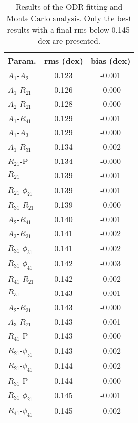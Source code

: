 \documentclass[article]{aa} %
\begin{document}
\begin{table}[]
\caption{\label{Tab:odr_short} \small Results of the ODR fitting and Monte Carlo analysis. Only the best results with a final rms below 0.145$\,$dex are presented.}
\begin{center}
\begin{tabular}{l|c|c}%
\hline
\hline
Param.& rms (dex) & bias (dex) \\ 

\hline
$A_1$-$A_2$& 0.123 & -0.001 \\
$A_1$-$R_{21}$& 0.126 & -0.000 \\
$A_2$-$R_{21}$& 0.128 & -0.000 \\
$A_1$-$R_{41}$& 0.129 & -0.001 \\
$A_1$-$A_3$& 0.129 & -0.000 \\
$A_1$-$R_{31}$& 0.134 & -0.002 \\
$R_{21}$-P& 0.134 & -0.000 \\
$R_{21}$&0.139&-0.001\\
$R_{21}$-$\phi_{21}$& 0.139 & -0.001 \\
$R_{31}$-$R_{21}$& 0.139 & -0.000 \\
$A_2$-$R_{41}$& 0.140 & -0.001 \\
$A_3$-$R_{31}$& 0.141 & -0.002 \\
$R_{31}$-$\phi_{31}$& 0.141 & -0.002 \\
$R_{31}$-$\phi_{41}$& 0.142 & -0.003 \\
$R_{41}$-$R_{21}$& 0.142 & -0.002 \\
$R_{31}$&0.143&-0.001\\
$A_2$-$R_{31}$& 0.143 & -0.000 \\
$A_3$-$R_{21}$& 0.143 & -0.001 \\
$R_{41}$-P& 0.143 & -0.000 \\
$R_{21}$-$\phi_{31}$& 0.143 & -0.002 \\
$R_{21}$-$\phi_{41}$& 0.144 & -0.002\\
$R_{31}$-P& 0.144 & -0.000 \\
$R_{31}$-$\phi_{21}$& 0.145 & -0.001 \\
$R_{41}$-$\phi_{41}$& 0.145 & -0.002 \\
\hline
\end{tabular}
\normalsize
\end{center}
\end{table}

 
\end{document}
